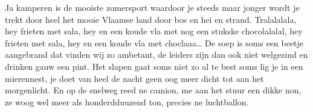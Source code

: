 
\beginverse
Ja kamperen is de mooiste zomersport
waardoor je steeds maar jonger wordt
je trekt door heel het mooie Vlaamse land
door bos en hei en strand.
\endverse
\beginchorus
Tralalalala, hey frieten met sala, hey
en een koude vla met nog een stukske
chocolalalal, hey frieten met sala, hey
en een koude vla met choclaaa…
\endchorus
\beginverse
De soep is soms een beetje aangebrand
dat vinden wij zo ambetant, 
de leiders zijn dan ook niet welgezind
en drinken gauw een pint.
\endverse
\beginverse
Het slapen gaat soms niet zo al te best
soms lig je in een mierennest,
je doet van heel de nacht geen oog meer dicht
tot aan het morgenlicht.
\endverse
\beginverse
En op de snelweg reed ne camion,
me aan het stuur een dikke non,
ze woog wel meer als honderdduuzend ton,
precies ne luchtballon.
\endverse
\endsong